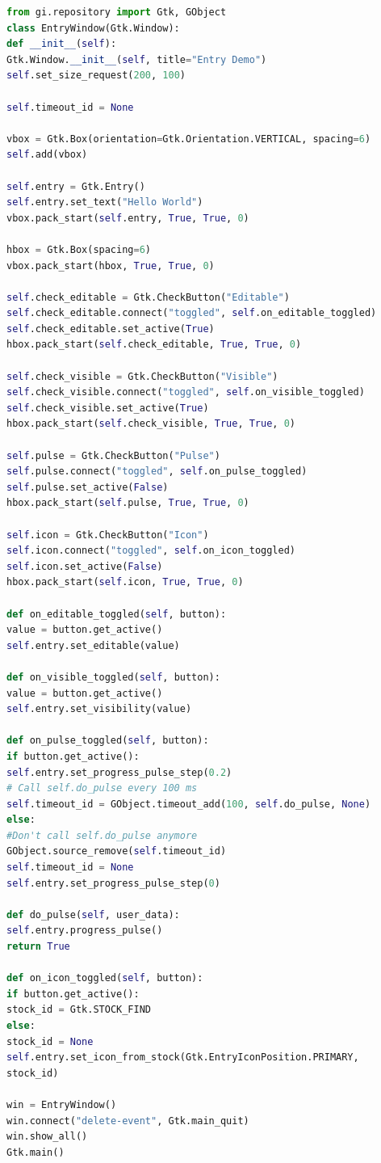 \documentclass[12pt, twoside]{report}
\begin{document}
\begin{lstlisting}[language=Python]
from gi.repository import Gtk, GObject
class EntryWindow(Gtk.Window):
def __init__(self):
Gtk.Window.__init__(self, title="Entry Demo")
self.set_size_request(200, 100)

self.timeout_id = None

vbox = Gtk.Box(orientation=Gtk.Orientation.VERTICAL, spacing=6)
self.add(vbox)

self.entry = Gtk.Entry()
self.entry.set_text("Hello World")
vbox.pack_start(self.entry, True, True, 0)

hbox = Gtk.Box(spacing=6)
vbox.pack_start(hbox, True, True, 0)

self.check_editable = Gtk.CheckButton("Editable")
self.check_editable.connect("toggled", self.on_editable_toggled)
self.check_editable.set_active(True)
hbox.pack_start(self.check_editable, True, True, 0)

self.check_visible = Gtk.CheckButton("Visible")
self.check_visible.connect("toggled", self.on_visible_toggled)
self.check_visible.set_active(True)
hbox.pack_start(self.check_visible, True, True, 0)

self.pulse = Gtk.CheckButton("Pulse")
self.pulse.connect("toggled", self.on_pulse_toggled)
self.pulse.set_active(False)
hbox.pack_start(self.pulse, True, True, 0)

self.icon = Gtk.CheckButton("Icon")
self.icon.connect("toggled", self.on_icon_toggled)
self.icon.set_active(False)
hbox.pack_start(self.icon, True, True, 0)

def on_editable_toggled(self, button):
value = button.get_active()
self.entry.set_editable(value)

def on_visible_toggled(self, button):
value = button.get_active()
self.entry.set_visibility(value)

def on_pulse_toggled(self, button):
if button.get_active():
self.entry.set_progress_pulse_step(0.2)
# Call self.do_pulse every 100 ms
self.timeout_id = GObject.timeout_add(100, self.do_pulse, None)
else:
#Don't call self.do_pulse anymore
GObject.source_remove(self.timeout_id)
self.timeout_id = None
self.entry.set_progress_pulse_step(0)

def do_pulse(self, user_data):
self.entry.progress_pulse()
return True

def on_icon_toggled(self, button):
if button.get_active():
stock_id = Gtk.STOCK_FIND
else:
stock_id = None
self.entry.set_icon_from_stock(Gtk.EntryIconPosition.PRIMARY,
stock_id)

win = EntryWindow()
win.connect("delete-event", Gtk.main_quit)
win.show_all()
Gtk.main()
\end{lstlisting}




\end{document}
